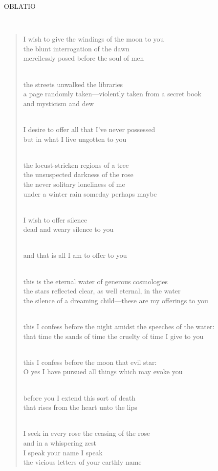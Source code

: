 \documentclass[a4paper, 12pt]{article}
\begin{document}
\pagebreak

\centerline{OBLATIO}
~ 
\begin{verse}
    
I wish to give the windings of the moon to you\\
the blunt interrogation of the dawn\\
mercilessly posed before the soul of men\\
~ 

the streets unwalked the libraries\\
a page randomly taken—violently taken from a secret book\\
and mysticism and dew\\
~ 

I desire to offer all that I’ve never possessed\\
but in what I live ungotten to you\\
~ 

the locust-stricken regions of a tree\\
the unsuspected darkness of the rose\\
the never solitary loneliness of me\\
under a winter rain someday perhaps maybe\\
~ 

I wish to offer silence\\
dead and weary silence to you\\
~ 

and that is all I am to offer to you\\
~ 

this is the eternal water of generous cosmologies\\
the stars reflected clear, as well eternal, in the water\\
the silence of a dreaming child—these are my offerings to you\\
~ 

this I confess before the night amidst the speeches of the water:\\
that time the sands of time the cruelty of time I give to you\\
~ 

this I confess before the moon that evil star:\\
O yes I have pursued all things which may evoke you\\
~ 

before you I extend this sort of death\\
that rises from the heart unto the lips\\
~ 

I seek in every rose the ceasing of the rose\\
and in a whispering zest\\
I speak your name I speak\\
the vicious letters of your earthly name\\
\end{verse}
\end{document}
